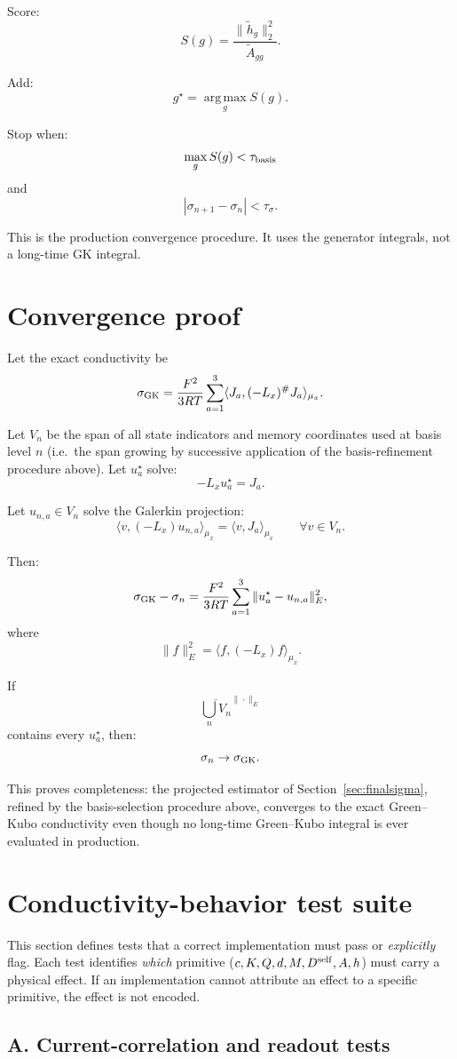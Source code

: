 \documentclass[11pt]{article}
\newcommand{\argmax}{\operatorname*{arg\,max}}
\begin{document}
Score:
\[
S(g)
=
\frac{\|\tilde h_g\|_2^2}{\tilde A_{gg}}.
\]

Add:
\[
g^\star=\argmax_g S(g).
\]

Stop when:
\[
\max_gS(g)<\tau_{\rm basis}
\]
and
\[
|\sigma_{n+1}-\sigma_n|<\tau_\sigma.
\]

This is the production convergence procedure. It uses the generator integrals,
not a long-time GK integral.

\section{Convergence proof}

Let the exact conductivity be
\[
\sigma_{\rm GK}
=
\frac{F^2}{3RT}
\sum_{a=1}^3
\langle J_a,(-L_x)^\#J_a\rangle_{\mu_x}.
\]

Let \(V_n\) be the span of all state indicators and memory coordinates used at
basis level \(n\) (i.e.\ the span growing by successive application of the
basis-refinement procedure above). Let \(u_a^\star\) solve:
\[
-L_xu_a^\star=J_a.
\]

Let \(u_{n,a}\in V_n\) solve the Galerkin projection:
\[
\langle v,(-L_x)u_{n,a}\rangle_{\mu_x}
=
\langle v,J_a\rangle_{\mu_x}
\qquad
\forall v\in V_n.
\]

Then:
\[
\sigma_{\rm GK}-\sigma_n
=
\frac{F^2}{3RT}
\sum_{a=1}^3
\|u_a^\star-u_{n,a}\|_E^2,
\]
where
\[
\|f\|_E^2=\langle f,(-L_x)f\rangle_{\mu_x}.
\]

If
\[
\overline{\bigcup_n V_n}^{\|\cdot\|_E}
\]
contains every \(u_a^\star\), then:
\[
\sigma_n\to\sigma_{\rm GK}.
\]

This proves completeness: the projected estimator of
Section~\ref{sec:finalsigma}, refined by the basis-selection procedure above,
converges to the exact Green--Kubo conductivity even though no long-time
Green--Kubo integral is ever evaluated in production.

\section{Conductivity-behavior test suite}
\label{sec:tests}

This section defines tests that a correct implementation must pass or
\emph{explicitly} flag. Each test identifies \emph{which} primitive
(\(c,K,Q,d,M,D^{\rm self},A,h\)) must carry a physical effect.
If an implementation cannot attribute an effect to a specific primitive,
the effect is not encoded.

\subsection{A. Current-correlation and readout tests}
\end{document}
